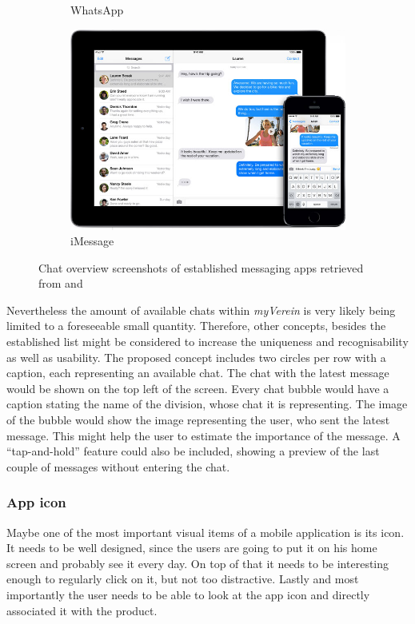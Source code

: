 \begin{figure}[h]
\begin{subfigure}{.33\textwidth}
  		\caption{WhatsApp}
  		\label{fig:ChatWA}
	\end{subfigure}
	\begin{subfigure}{.66\textwidth}
  		\centering
  		\includegraphics[width=0.98\linewidth]{./images/imessage-screen.jpg}
  		\caption{iMessage}
  		\label{fig:ChatiMessage}
	\end{subfigure}
	\caption{Chat overview screenshots of established messaging apps retrieved from \cite{Inc.:2015aa} and \cite{Stuckler:2013aa}}
	\label{fig:ChatScreens}
\end{figure}
\nocite{Inc.:2015aa, Stuckler:2013aa}

Nevertheless the amount of available chats within \emph{myVerein} is very likely being limited to a foreseeable small quantity. Therefore, other concepts, besides the established list might be considered to increase the uniqueness and recognisability as well as usability. The proposed concept includes two circles per row with a caption, each representing an available chat. The chat with the latest message would be shown on the top left of the screen. Every chat bubble would have a caption stating the name of the division, whose chat it is representing. The image of the bubble would show the image representing the user, who sent the latest message. This might help the user to estimate the importance of the message. A \enquote{tap-and-hold} feature could also be included, showing a preview of the last couple of messages without entering the chat.

\subsubsection{App icon}
Maybe one of the most important visual items of a mobile application is its icon. It needs to be well designed, since the users are going to put it on his home screen and probably see it every day. On top of that it needs to be interesting enough to regularly click on it, but not too distractive. Lastly and most importantly the user needs to be able to look at the app icon and directly associated it with the product. \cite{Flarup:2015aa}

